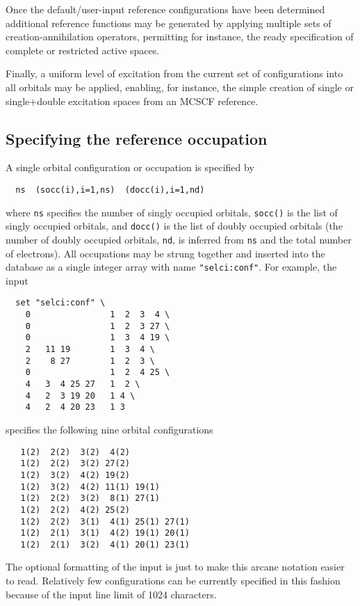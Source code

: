 Once the default/user-input reference configurations have been
determined additional reference functions may be generated by applying
multiple sets of creation-annihilation operators, permitting for
instance, the ready specification of complete or restricted active
spaces.

Finally, a uniform level of excitation from the current set of
configurations into all orbitals may be applied, enabling, for
instance, the simple creation of single or single+double excitation 
spaces from an MCSCF reference.

\subsection{Specifying the reference occupation}

A single orbital configuration or occupation is specified by
\begin{verbatim}
  ns  (socc(i),i=1,ns)  (docc(i),i=1,nd)
\end{verbatim}
where \verb+ns+ specifies the number of singly occupied orbitals,
\verb+socc()+ is the list of singly occupied orbitals, and
\verb+docc()+ is the list of doubly occupied orbitals (the
number of doubly occupied orbitals, \verb+nd+, is inferred from
\verb+ns+ and the total number of electrons).  All occupations may be
strung together and inserted into the database as a single integer
array with name \verb+"selci:conf"+.  For example, the input
\begin{verbatim}
  set "selci:conf" \
    0                1  2  3  4 \
    0                1  2  3 27 \
    0                1  3  4 19 \
    2   11 19        1  3  4 \
    2    8 27        1  2  3 \
    0                1  2  4 25 \
    4   3  4 25 27   1  2 \
    4   2  3 19 20   1 4 \
    4   2  4 20 23   1 3  
\end{verbatim}
specifies the following nine orbital configurations
\begin{verbatim}
   1(2)  2(2)  3(2)  4(2)
   1(2)  2(2)  3(2) 27(2)
   1(2)  3(2)  4(2) 19(2)
   1(2)  3(2)  4(2) 11(1) 19(1)
   1(2)  2(2)  3(2)  8(1) 27(1)
   1(2)  2(2)  4(2) 25(2)
   1(2)  2(2)  3(1)  4(1) 25(1) 27(1)
   1(2)  2(1)  3(1)  4(2) 19(1) 20(1)
   1(2)  2(1)  3(2)  4(1) 20(1) 23(1)
\end{verbatim}
The optional formatting of the input is just to make this arcane
notation easier to read.  Relatively few configurations can be
currently specified in this fashion because of the input line limit of
1024 characters.

